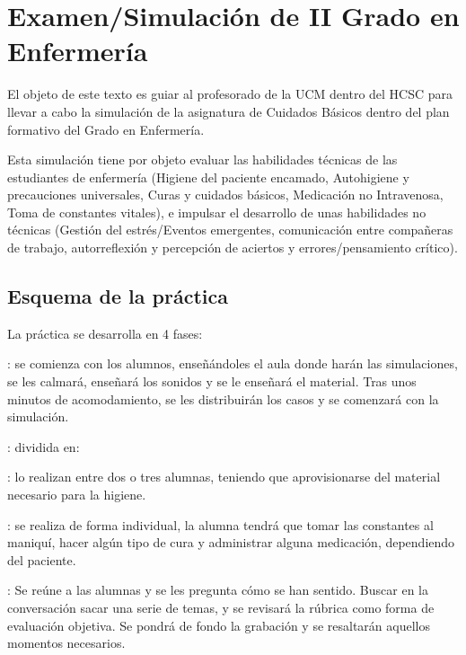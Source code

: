 \section{Examen/Simulación de II Grado en Enfermería}
El objeto de este texto es guiar al profesorado de la UCM dentro del HCSC para llevar a cabo la simulación de la asignatura de Cuidados Básicos dentro del plan formativo del Grado en Enfermería.

Esta simulación tiene por objeto evaluar las habilidades técnicas de las estudiantes de enfermería (Higiene del paciente encamado, Autohigiene y precauciones universales, Curas y cuidados básicos, Medicación no Intravenosa, Toma de constantes vitales), e impulsar el desarrollo de unas habilidades no técnicas (Gestión del estrés/Eventos emergentes, comunicación entre compañeras de trabajo, autorreflexión y percepción de aciertos y errores/pensamiento crítico).

\subsection{Esquema de la práctica}
La práctica se desarrolla en 4 fases:
\begin{description}[topsep=0pt, partopsep=0pt,itemsep=0pt,parsep=0pt]
    \item [Prebriefing]: se comienza con los alumnos, enseñándoles el aula donde harán las simulaciones, se les calmará, enseñará los sonidos y se le enseñará el material. Tras unos minutos de acomodamiento, se les distribuirán los casos y se comenzará con la simulación.
    \item [Simulación]: dividida en:
    \begin{description}[topsep=0pt, partopsep=0pt,itemsep=0pt,parsep=0pt]
        \item [Simulación del paciente encamado]: lo realizan entre dos o tres alumnas, teniendo que aprovisionarse del material necesario para la higiene.
        \item [Simulación de cuidados del paciente]: se realiza de forma individual, la alumna tendrá que tomar las constantes al maniquí, hacer algún tipo de cura y administrar alguna medicación, dependiendo del paciente.
    \end{description}
    \item [Debriefing]: Se reúne a las alumnas y se les pregunta cómo se han sentido. Buscar en la conversación sacar una serie de temas, y se revisará la rúbrica como forma de evaluación objetiva. Se pondrá de fondo la grabación y se resaltarán aquellos momentos necesarios.
\end{description}
